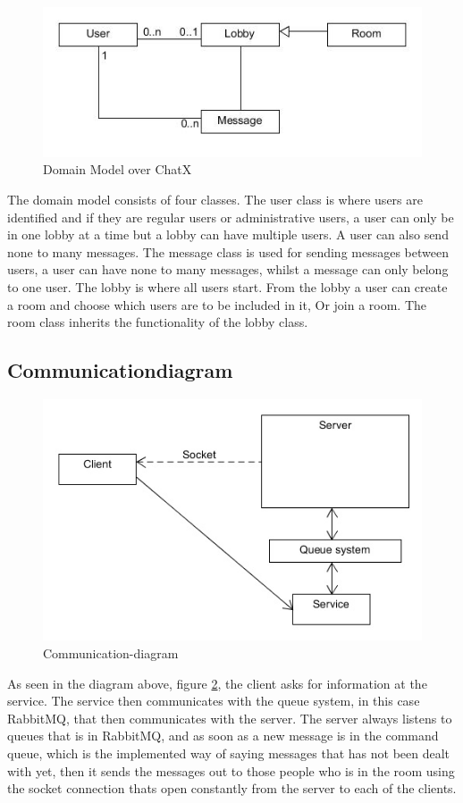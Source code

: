 \begin{figure}[H]
\centering
\includegraphics[width=0.7\linewidth]{img/DomainModelChatX}
\caption{Domain Model over ChatX}
\label{fig:DomainModelChatX}
\end{figure}

The domain model consists of four classes. The user class is where users are identified and if they are regular users or administrative users, a user can only be in one lobby at a time but a lobby can have multiple users. A user can also send none to many messages. The message class is used for sending messages between users, a user can have none to many messages, whilst a message can only belong to one user. The lobby is where all users start. From the lobby a user can create a room and choose which users are to be included in it, Or join a room. The room class inherits the functionality of the lobby class.

\clearpage
\subsection{Communicationdiagram}

\begin{figure}[h]
\centering
\includegraphics[width=0.7\linewidth]{img/Communicationdiagram}
\caption[Communication-diagram]{Communication-diagram}
\label{fig:Communicationdiagram}
\end{figure}

As seen in the diagram above, figure \ref{fig:Communicationdiagram}, the client asks for information at the service. The service then communicates with the queue system, in this case RabbitMQ, that then communicates with the server. The server always listens to queues that is in RabbitMQ, and as soon as a new message is in the command queue, which is the implemented way of saying messages that has not been dealt with yet, then it sends the messages out to those people who is in the room using the socket connection thats open constantly from the server to each of the clients.
